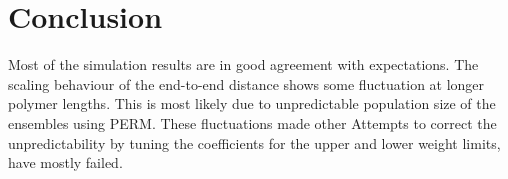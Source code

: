 \section{Conclusion}
Most of the simulation results are in good agreement with expectations. The scaling behaviour of the end-to-end distance shows some fluctuation at longer polymer lengths. This is most likely due to unpredictable population size of the ensembles using PERM. These fluctuations made other Attempts to correct the unpredictability by tuning the coefficients for the upper and lower weight limits, have mostly failed.